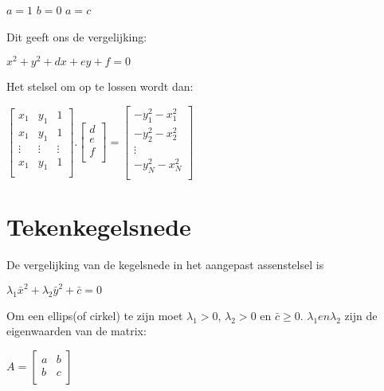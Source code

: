 \documentclass[]{article}
\begin{document}
 \begin{center}
 $ a = 1$	   \quad \quad \quad      	$b = 0$    \quad \quad \quad   	$a = c$
 \end{center}
 
 \noindent Dit geeft ons de vergelijking:
 
 \begin{center}
  $x^2 + y^2 + dx +  ey + f = 0$
  \end{center}
  
  \noindent Het stelsel om op te lossen wordt dan:
   
   \begin{center}
   $
   \begin{bmatrix}
    x_{1} & y_{1} & 1 \\
    x_{1} & y_{1} & 1 \\
   \vdots & \vdots & \vdots \\
    x_{1} & y_{1} & 1 \\
   \end{bmatrix}
   .
    \begin{bmatrix}
    d\\
    e\\
    f\\
    \end{bmatrix}
    =
     \begin{bmatrix}
      -y^2_1-x^2_1\\
      -y^2_2-x^2_2\\
      \vdots\\
      -y^2_N-x^2_N\\
      \end{bmatrix}
      $
       \end{center}
 
 
 
 \section*{Tekenkegelsnede}
 
 De vergelijking van de kegelsnede in het aangepast assenstelsel is 
\begin{center}
 $\lambda_1 \bar{x}^2 + \lambda_2 \bar{y}^2 + \bar{c} = 0$
\end{center} 
Om een ellips(of cirkel) te zijn moet $\lambda_1 > 0$, $\lambda_2 > 0$ en $\bar{c} \ge 0$. $\lambda_1 en \lambda_2$ zijn de eigenwaarden van de matrix:

\begin{center}
$		A
		=
     \begin{bmatrix}
      a & b \\
      b & c\\
      \end{bmatrix}
      $
      \end{center}
      
\end{document}

